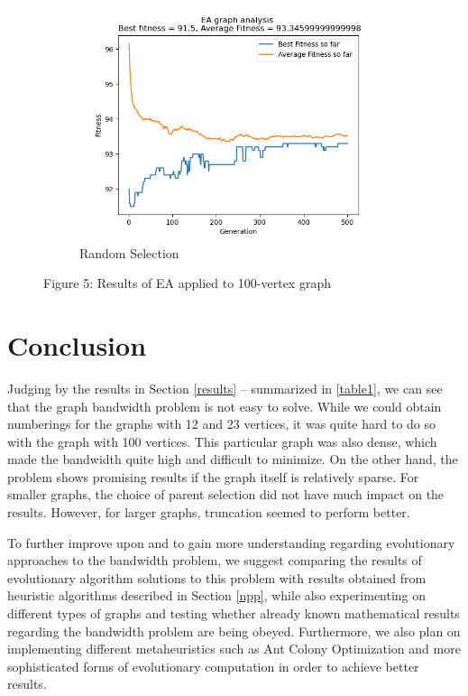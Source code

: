 \documentclass[conference,compsoc]{IEEEtran}
\begin{document}
\begin{figure}[h!]
\begin{subfigure}{0.34\textwidth}
    \includegraphics[width=\linewidth]{../Results/_100_Random_Truncation_200_100_500.png}
    \caption{Random Selection}
  \end{subfigure}
  \caption*{Figure 5: Results of EA applied to 100-vertex graph}
\end{figure}

\newpage
\setlength{\parskip}{0 em}
\section{Conclusion}
Judging by the results in Section \ref{results} -- summarized in \ref{table1}, we can see that the graph bandwidth problem is not easy to solve. 
While we could obtain numberings for the graphs with 12 and 23 vertices, it was quite hard to do so with the graph with 
100 vertices. This particular graph was also dense, which made the bandwidth quite high and difficult to minimize. On the 
other hand, the problem shows promising results if the graph itself is relatively sparse. For smaller graphs, the choice of 
parent selection did not have much impact on the results. However, for larger graphs, truncation seemed to perform better.

To further improve upon and to gain more understanding regarding evolutionary approaches to the bandwidth problem, 
we suggest comparing the results of evolutionary algorithm solutions to this problem with results obtained 
from heuristic algorithms described in Section \ref{npp}, while also experimenting on different 
types of graphs and testing whether already known mathematical results regarding the bandwidth problem 
are being obeyed. Furthermore, we also plan on implementing different metaheuristics
such as Ant Colony Optimization and more sophisticated forms of evolutionary computation in order to achieve better results.      
\end{document}
